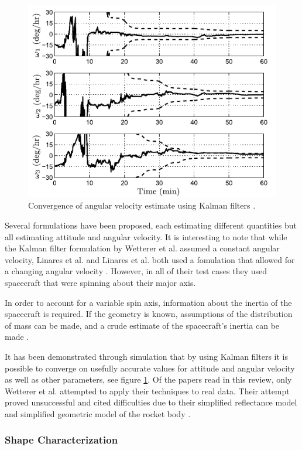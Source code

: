 \documentclass{article}
\begin{document}
\begin{figure}[h]
	\centering
	\includegraphics[width=.5\textwidth]{Kalman_convergence}
	\caption{Convergence of angular velocity estimate using Kalman filters \cite{SpaceObjectCharacterization}.}
	\label{ukf_convergence_im}
\end{figure}

Several formulations have been proposed, each estimating different quantities but all estimating attitude and angular velocity. It is interesting to note that while the Kalman filter formulation by Wetterer et al. assumed a constant angular velocity, Linares et al. and Linares et al. both used a fomulation that allowed for a changing angular velocity \cite{AttitudeEstimationFromLightCurve} \cite{LINARES20141} \cite{SpaceObjectCharacterization}. However, in all of their test cases they used spacecraft that were spinning about their major axis.

In order to account for a variable spin axis, information about the inertia of the spacecraft is required. If the geometry is known, assumptions of the distribution of mass can be made, and a crude estimate of the spacecraft's inertia can be made \cite{LINARES20141}.

It has been demonstrated through simulation that by using Kalman filters it is possible to converge on usefully accurate values for attitude and angular velocity as well as other parameters, see figure \ref{ukf_convergence_im}. Of the papers read in this review, only Wetterer et al. attempted to apply their techniques to real data. Their attempt proved unsuccessful and cited difficulties due to their simplified reflectance model and simplified geometric model of the rocket body \cite{AttitudeEstimationFromLightCurve}.


\subsubsection{Shape Characterization}
\end{document}
